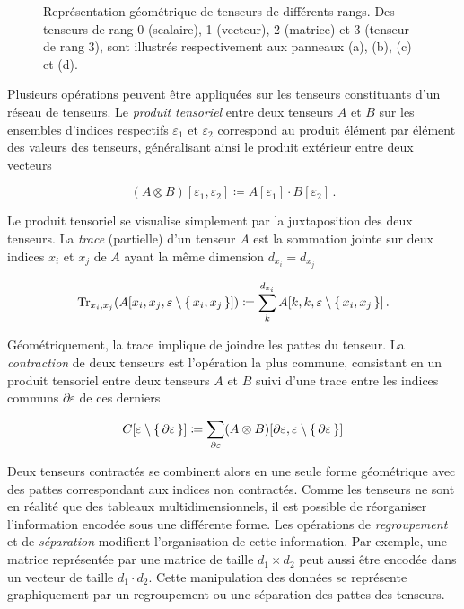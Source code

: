 \begin{figure}[h]
\begin{subfigure}[h]{0.2\textwidth}
        \label{fig:tensor-rank-3}
    \end{subfigure}
    \caption[Représentation géométrique des tenseurs]{Représentation géométrique de tenseurs de différents rangs. Des tenseurs de rang 0 (scalaire), 1 (vecteur), 2 (matrice) et 3 (tenseur de rang 3), sont illustrés respectivement aux panneaux (a), (b), (c) et (d).}
    \label{fig:tensor} 
\end{figure}

Plusieurs opérations peuvent être appliquées sur les tenseurs constituants d'un réseau de tenseurs. Le \textit{produit tensoriel} entre deux tenseurs $A$ et $B$ sur les ensembles d'indices respectifs $\varepsilon_{1}$ et $\varepsilon_{2}$ correspond au produit élément par élément des valeurs des tenseurs, généralisant ainsi le produit extérieur entre deux vecteurs

\begin{equation}
    (A \otimes B)[\varepsilon_{1}, \varepsilon_{2}] \coloneq A[\varepsilon_{1}] \cdot B[\varepsilon_{2}] \,.
\end{equation}

Le produit tensoriel se visualise simplement par la juxtaposition des deux tenseurs. La \textit{trace} (partielle) d'un tenseur $A$ est la sommation jointe sur deux indices $x_{i}$ et $x_{j}$ de $A$ ayant la même dimension $d_{x_{i}} = d_{x_{j}}$

\begin{equation}
    \text{Tr}_{x_{i}, x_{j}} (A[x_{i}, x_{j}, \varepsilon \setminus \set{x_{i}, x_{j}}]) \coloneq \sum_{k}^{d_{x_{i}}} A[k, k, \varepsilon \setminus \set{x_{i}, x_{j}} ] \,. 
\end{equation}

Géométriquement, la trace implique de joindre les pattes du tenseur. La \textit{contraction} de deux tenseurs est l'opération la plus commune, consistant en un produit tensoriel entre deux tenseurs $A$ et $B$ suivi d'une trace entre les indices communs $\partial \varepsilon$ de ces derniers

\begin{equation}
    C[\varepsilon \setminus \set{ \partial \varepsilon}] \coloneq  \sum_{\partial \varepsilon} (A \otimes B)[\partial \varepsilon,  \varepsilon \setminus \set{ \partial \varepsilon}]
\end{equation}

Deux tenseurs contractés se combinent alors en une seule forme géométrique avec des pattes correspondant aux indices non contractés. Comme les tenseurs ne sont en réalité que des tableaux multidimensionnels, il est possible de réorganiser l'information encodée sous une différente forme. Les opérations de \textit{regroupement} et de \textit{séparation} modifient l'organisation de cette information. Par exemple, une matrice représentée par une matrice de taille $d_{1} \times d_{2}$ peut aussi être encodée dans un vecteur de taille $d_{1} \cdot d_{2}$. Cette manipulation des données se représente graphiquement par un regroupement ou une séparation des pattes des tenseurs.


